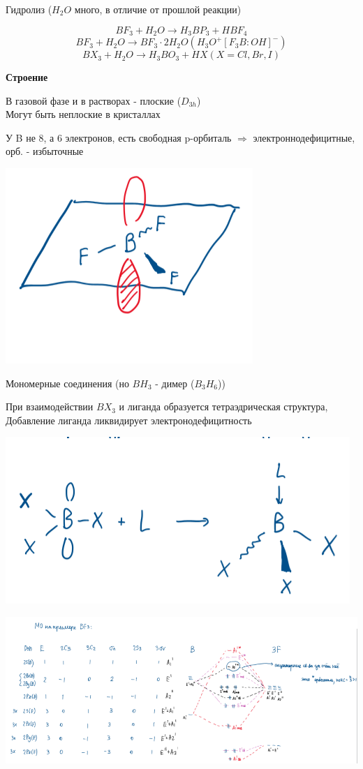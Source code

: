 \documentclass[14pt,a4paper]{scrartcl}
\begin{document}
Гидролиз ($H_2O$ много, в отличие от прошлой реакции)

$$BF_3 + H_2O \rightarrow H_3BP_3 + HBF_4$$
$$BF_3 + H_2O \rightarrow BF_3\cdot 2H_2O (H_3O^+[F_3B:OH]^-)$$
$$BX_3 + H_2O \rightarrow H_3BO_3 + HX (X=Cl,Br,I)$$

\textbf{Строение}

В газовой фазе и в растворах - плоские ($D_{3h}$)\\
Могут быть неплоские в кристаллах

У B не 8, а 6 электронов, есть свободная p-орбиталь $\Rightarrow$ электроннодефицитные, орб. - избыточные

\includegraphics{11v9.png}

Мономерные соединения (но $BH_3$ - димер ($B_3H_6$))

При взаимодействии $BX_3$ и лиганда образуется тетраэдрическая структура,\\
Добавление лиганда ликвидирует электронодефицитность

\includegraphics{11v10.png}

\includegraphics{11v11.png}
\end{document}
